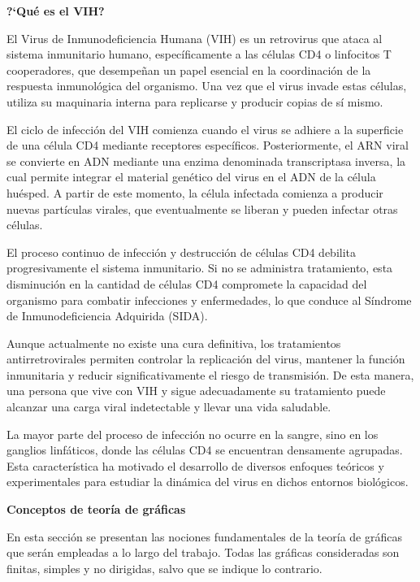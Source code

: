 \documentclass[12pt,titlepage,twoside,openright]{book}
\begin{document}
\textbf{?`Qu\'e es el VIH?}

El Virus de Inmunodeficiencia Humana (VIH) es un retrovirus que ataca al sistema inmunitario humano, espec\'ificamente a las c\'elulas CD4 o linfocitos T cooperadores, que desempe\~nan un papel esencial en la coordinaci\'on de la respuesta inmunol\'ogica del organismo. Una vez que el virus invade estas c\'elulas, utiliza su maquinaria interna para replicarse y producir copias de s\'i mismo.

El ciclo de infecci\'on del VIH comienza cuando el virus se adhiere a la superficie de una c\'elula CD4 mediante receptores espec\'ificos. Posteriormente, el ARN viral se convierte en ADN mediante una enzima denominada transcriptasa inversa, la cual permite integrar el material gen\'etico del virus en el ADN de la c\'elula hu\'esped. A partir de este momento, la c\'elula infectada comienza a producir nuevas part\'iculas virales, que eventualmente se liberan y pueden infectar otras c\'elulas.

El proceso continuo de infecci\'on y destrucci\'on de c\'elulas CD4 debilita progresivamente el sistema inmunitario. Si no se administra tratamiento, esta disminuci\'on en la cantidad de c\'elulas CD4 compromete la capacidad del organismo para combatir infecciones y enfermedades, lo que conduce al S\'indrome de Inmunodeficiencia Adquirida (SIDA).

Aunque actualmente no existe una cura definitiva, los tratamientos antirretrovirales permiten controlar la replicaci\'on del virus, mantener la funci\'on inmunitaria y reducir significativamente el riesgo de transmisi\'on. De esta manera, una persona que vive con VIH y sigue adecuadamente su tratamiento puede alcanzar una carga viral indetectable y llevar una vida saludable.

La mayor parte del proceso de infecci\'on no ocurre en la sangre, sino en los ganglios linf\'aticos, donde las c\'elulas CD4 se encuentran densamente agrupadas. Esta caracter\'istica ha motivado el desarrollo de diversos enfoques te\'oricos y experimentales para estudiar la din\'amica del virus en dichos entornos biol\'ogicos.

\textbf{Conceptos de teor\'ia de gr\'aficas}

En esta secci\'on se presentan las nociones fundamentales de la teor\'ia de gr\'aficas \cite{Harary} que ser\'an empleadas a lo largo del trabajo. Todas las gr\'aficas consideradas son finitas, simples y no dirigidas, salvo que se indique lo contrario.
\end{document}

